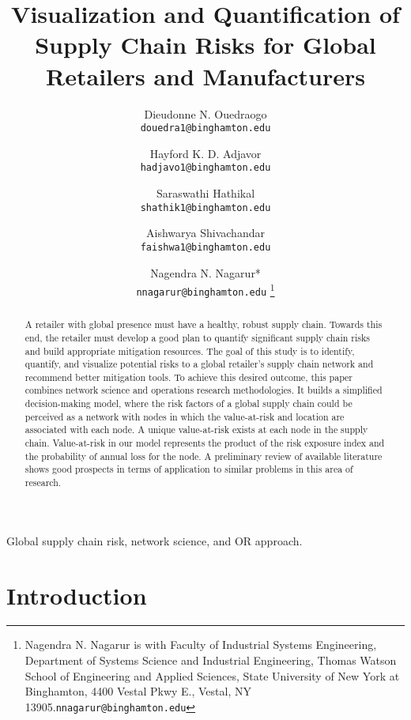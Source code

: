 \documentclass[conference]{IEEEtran}
\title{\LARGE \bf Visualization and Quantification of Supply Chain Risks for Global Retailers and Manufacturers}
\author{
	Dieudonne N. Ouedraogo\\
	\texttt{douedra1@binghamton.edu}
	\and
	Hayford K. D. Adjavor\\
	\texttt{hadjavo1@binghamton.edu}
		\and
	Saraswathi Hathikal\\
	\texttt{shathik1@binghamton.edu}
		\and
	 Aishwarya Shivachandar\\
	\texttt{faishwa1@binghamton.edu}
		\and
	Nagendra N. Nagarur*\\
	\texttt{nnagarur@binghamton.edu} \thanks{Nagendra N. Nagarur is with Faculty of Industrial Systems Engineering, Department of Systems Science and Industrial Engineering, Thomas Watson School of Engineering and Applied Sciences, State University of New York at Binghamton, 4400 Vestal Pkwy E., Vestal, NY 13905.{\tt\small nnagarur@binghamton.edu}}} %
\begin{document}
\maketitle
{}
\thispagestyle{empty}
\pagestyle{empty}


\begin{abstract}

A retailer with global presence must have a healthy, robust supply chain. Towards this end, the retailer must develop a good plan to quantify significant supply chain risks and build appropriate mitigation resources. The goal of this study is to identify, quantify, and visualize potential risks to a global retailer’s supply chain network and recommend better mitigation tools. To achieve this desired outcome, this paper combines network science and operations research methodologies. It builds a simplified decision-making model, where the risk factors of a global supply chain could be perceived as a network with nodes in which the value-at-risk and location are associated with each node. A unique value-at-risk exists at each node in the supply chain. Value-at-risk in our model represents the product of the risk exposure index and the probability of annual loss for the node. A preliminary review of available literature shows good prospects in terms of application to similar problems in this area of research.
\end{abstract}

\begin{IEEEkeywords}
	Global supply chain risk, network science, and OR approach.
\end{IEEEkeywords}
\section{Introduction}
\end{document}
